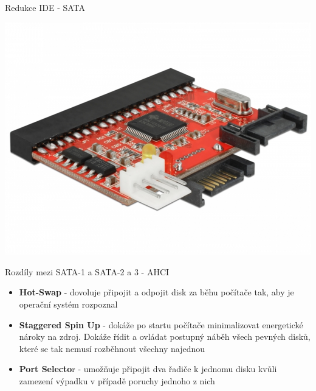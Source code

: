 \documentclass[aspectratio=43]{beamer}
\begin{document}
\begin{frame}{Redukce IDE - SATA}
	\begin{center}
			\includegraphics[width=1\linewidth]{extrahovane_obrazky/ide_sata.jpeg}
		\end{center}
\end{frame}


\begin{frame}{Rozdíly mezi SATA-1 a SATA-2 a 3 - AHCI}
	\begin{itemize}
		\item \textbf{Hot-Swap} - dovoluje připojit a odpojit disk za běhu  počítače tak, aby je operační systém rozpoznal
		\item \textbf{Staggered Spin Up} - dokáže po startu počítače minimalizovat energetické nároky na zdroj. Dokáže řídit a ovládat postupný náběh všech pevných disků, které se tak nemusí rozběhnout všechny najednou
		\item \textbf{Port Selecto}r - umožňuje připojit dva řadiče k jednomu disku kvůli zamezení výpadku v případě poruchy jednoho z nich
	\end{itemize}
	
\end{frame}
\end{document}
